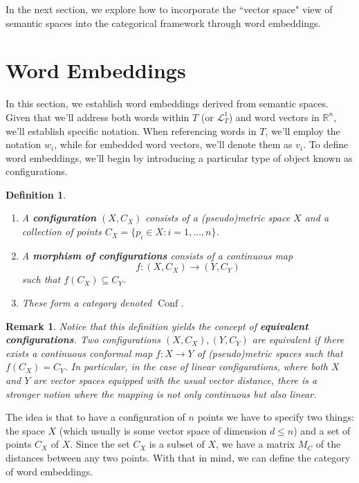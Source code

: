 \documentclass[10pt,a4paper]{elsarticle}
\renewcommand{\Bbb}{\mathbb}
\newcommand{\R}{\Bbb{R}}
\renewcommand{\L}{\mathcal{L}}
\newcommand{\Conf}{\operatorname{Conf}}
\newtheorem{definition}[theorem]{Definition}
\newtheorem{re}[theorem]{Remark}
\begin{document}
In the next section, we explore how to incorporate the ``vector space" view of semantic spaces into the categorical framework through word embeddings.



\section{Word Embeddings}\label{sec:WE}

In this section, we establish word embeddings derived from semantic spaces. Given that we'll address both words within $ T $ (or $ \L_{T}^{1} $) and word vectors in $ \R^{n} $, we'll establish specific notation. When referencing words in $ T $, we'll employ the notation $ w_{i} $, while for embedded word vectors, we'll denote them as $ v_{i} $. To define word embeddings, we'll begin by introducing a particular type of object known as configurations.

\begin{definition}
	\begin{enumerate}
		\item A \textbf{configuration} $(X, C_{X})$ consists of a (pseudo)metric space $X$ and a collection of points $C_{X}=\{p_i\in X\colon i=1,\dots,n\}$.
		
		\item A \textbf{morphism of configurations} consists of a continuous map
		\begin{equation}
			f\colon (X,C_{X})\to(Y,C_{Y})
		\end{equation}
		such that $f(C_X)\subseteq C_{Y}$.
		
		\item These form a category denoted $\Conf$.
	\end{enumerate}
\end{definition}

\begin{re}
Notice that this definition yields the concept of \textbf{equivalent configurations}. Two configurations $ (X,C_{X}),(Y,C_{Y}) $ are equivalent if there exists a continuous conformal map $ f\colon X\to Y $ of (pseudo)metric spaces such that $ f(C_{X}) = C_{Y} $. In particular, in the case of linear configurations, where both $ X $ and $ Y $ are vector spaces equipped with the usual vector distance, there is a stronger notion where the mapping is not only continuous but also linear.
\end{re}


The idea is that to have a configuration of $n$ points we have to specify two things: the space $X$ (which usually is some vector space of dimension $d\leq n$) and a set of points $C_{X}$ of $X$. Since the set $C_{X}$ is a subset of $X$, we have a matrix $M_{C}$ of the distances between any two points. With that in mind, we can define the category of word embeddings.
\end{document}
